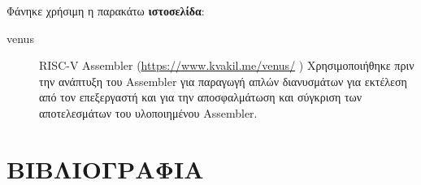 \documentclass[11pt]{extarticle}
\let\stdsection\section
\renewcommand\section{\newpage\stdsection}
\begin{document}
Φάνηκε χρήσιμη η παρακάτω \textbf{ιστοσελίδα}:
\begin{description}
    \item [venus] RISC-V Assembler (\href{https://www.kvakil.me/venus/}{https://www.kvakil.me/venus/} \cite{kvakil}) \newline
    Χρησιμοποιήθηκε πριν την ανάπτυξη του Assembler για παραγωγή απλών διανυσμάτων για εκτέλεση από τον επεξεργαστή και για την αποσφαλμάτωση και σύγκριση των αποτελεσμάτων του υλοποιημένου Assembler.
\end{description}


\section{ΒΙΒΛΙΟΓΡΑΦΙΑ}
\printbibliography[heading=none]
\end{document}
